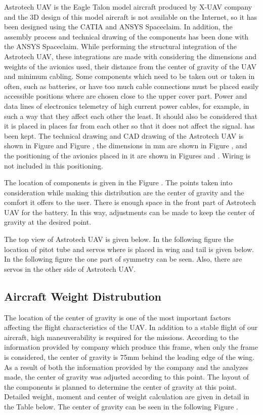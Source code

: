 \documentclass[12pt]{article}
\begin{document}
Astrotech UAV is the Eagle Talon model aircraft produced by X-UAV company and the 3D design of this model aircraft is not available on the Internet, so it has been designed using the CATIA and ANSYS Spaceclaim. In addition, the assembly process and technical drawing of the components has been done with the ANSYS Spaceclaim. While performing the structural integration of the Astrotech UAV, these integrations are made with considering the dimensions and weights of the avionics used, their distance from the center of gravity of the UAV and minimum cabling. Some components which need to be taken out or taken in often, such as batteries, or have too much cable connections must be placed easily accessible positions where are chosen close to the upper cover part. Power and data lines of electronics telemetry of high current power cables, for example, in such a way that they affect each other the least. It should also be considered that it is placed in places far from each other so that it does not affect the signal. has been kept. The technical drawing and CAD drawing of the Astrotech UAV is shown in Figure  and Figure , the dimensions in mm are shown in Figure , and the positioning of the avionics placed in it are shown in Figures  and . Wiring is not included in this positioning.


The location of components is given in the Figure . The points taken into consideration while making this distribution are the center of gravity and the comfort it offers to the user. There is enough space in the front part of Astrotech UAV for the battery. In this way, adjustments can be made to keep the center of gravity at the desired point.



The top view of Astrotech UAV is given below. In the following figure the location of pitot tube and servos where is placed in wing and tail is given below. In the following figure the one part of symmetry can be seen. Also, there are servos in the other side of Astrotech UAV.



\subsection{Aircraft Weight Distrubution}

The location of the center of gravity is one of the most important factors affecting the flight characteristics of the UAV. In addition to a stable flight of our aircraft, high maneuverability is required for the missions. According to the information provided by company which produce this frame, when only the frame is considered, the center of gravity is 75mm behind the leading edge of the wing. As a result of both the information provided by the company and the analyzes made, the center of gravity was adjusted according to this point. The layout of the components is planned to determine the center of gravity at this point. Detailed weight, moment and center of weight calculation are given in detail in the Table  below. The center of gravity can be seen in the following Figure .
\end{document}

